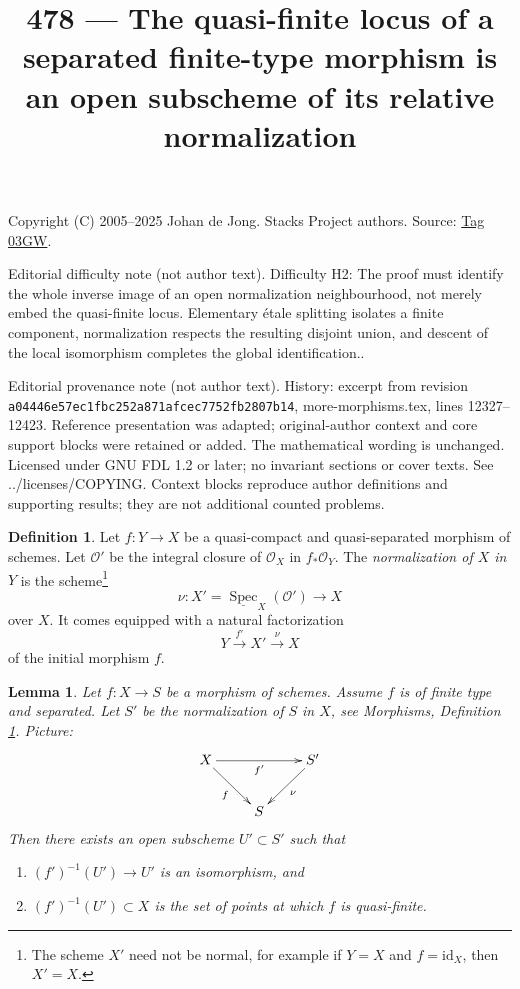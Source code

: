 \documentclass{amsart}
\theoremstyle{plain}
\newtheorem{lemma}[subsection]{Lemma}
\theoremstyle{definition}
\newtheorem{definition}[subsection]{Definition}
\theoremstyle{remark}
\numberwithin{equation}{subsection}
\def\Spec{\mathop{\mathrm{Spec}}}
\begin{document}
\title[Stacks Project, Tag 03GW]{478 --- The quasi-finite locus of a separated finite-type morphism is an open subscheme of its relative normalization}
\maketitle
\noindent Copyright (C) 2005--2025 Johan de Jong. Stacks Project authors. Source: \href{https://stacks.math.columbia.edu/tag/03GW}{Tag 03GW}.

\noindent Editorial difficulty note (not author text). Difficulty H2: The proof must identify the whole inverse image of an open normalization neighbourhood, not merely embed the quasi-finite locus. Elementary étale splitting isolates a finite component, normalization respects the resulting disjoint union, and descent of the local isomorphism completes the global identification..

\noindent Editorial provenance note (not author text). History: excerpt from revision \texttt{a0444\allowbreak 6e57e\allowbreak c1fbc\allowbreak 252a8\allowbreak 71afc\allowbreak ec775\allowbreak 2fb28\allowbreak 07b14}, more-morphisms.tex, lines 12327--12423. Reference presentation was adapted; original-author context and core support blocks were retained or added. The mathematical wording is unchanged. Licensed under GNU FDL 1.2 or later; no invariant sections or cover texts. See ../licenses/COPYING. Context blocks reproduce author definitions and supporting results; they are not additional counted problems.

\begin{definition}
\label{morphisms-definition-normalization-X-in-Y}
Let $f : Y \to X$ be a quasi-compact and quasi-separated morphism of schemes.
Let $\mathcal{O}'$ be the integral closure of $\mathcal{O}_X$ in
$f_*\mathcal{O}_Y$. The {\it normalization of $X$ in $Y$} is the
scheme\footnote{The scheme $X'$ need not be normal, for example if
$Y = X$ and $f = \text{id}_X$, then $X' = X$.}
$$
\nu : X' = \underline{\Spec}_X(\mathcal{O}') \to X
$$
over $X$. It comes equipped with a natural factorization
$$
Y \xrightarrow{f'} X' \xrightarrow{\nu} X
$$
of the initial morphism $f$.
\end{definition}

\begin{lemma}
\label{lemma-finite-type-separated}
Let $f : X \to S$ be a morphism of schemes.
Assume $f$ is of finite type and separated.
Let $S'$ be the normalization of $S$ in $X$, see
Morphisms, Definition \ref{morphisms-definition-normalization-X-in-Y}.
Picture:
$$
\xymatrix{
X \ar[rd]_f \ar[rr]_{f'} & & S' \ar[ld]^\nu \\
& S &
}
$$
Then there exists an open subscheme $U' \subset S'$ such that
\begin{enumerate}
\item $(f')^{-1}(U') \to U'$ is an isomorphism, and
\item $(f')^{-1}(U') \subset X$ is the set of points at which
$f$ is quasi-finite.
\end{enumerate}
\end{lemma}
\end{document}
